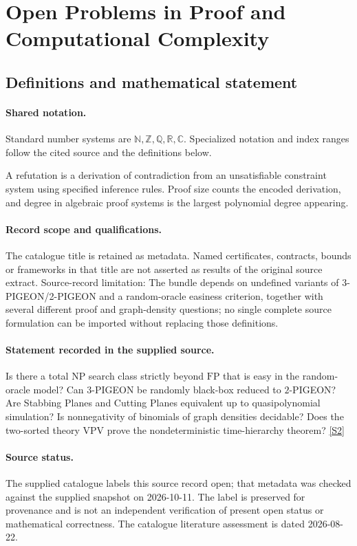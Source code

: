 \documentclass[11pt]{article}
\newcommand{\sref}[2]{\hyperlink{source:#1:#2}{[S#2]}}
\begin{document}
\section{Open Problems in Proof and Computational Complexity}\label{statement}

\subsection{Definitions and mathematical statement}

\paragraph{Shared notation.}Standard number systems are $\mathbb N,\mathbb Z,\mathbb Q,\mathbb R,\mathbb C$. Specialized notation and index ranges follow the cited source and the definitions below.


A refutation is a derivation of contradiction from an unsatisfiable constraint system using specified inference rules. Proof size counts the encoded derivation, and degree in algebraic proof systems is the largest polynomial degree appearing.
\paragraph{Record scope and qualifications.}
The catalogue title is retained as metadata. Named certificates, contracts, bounds or frameworks in that title are not asserted as results of the original source extract.
Source-record limitation: The bundle depends on undefined variants of 3-PIGEON/2-PIGEON and a random-oracle easiness criterion, together with several different proof and graph-density questions; no single complete source formulation can be imported without replacing those definitions.
\paragraph{Statement recorded in the supplied source.}
Is there a total NP search class strictly beyond $\mathrm{FP}$ that is easy in the random-oracle model? Can $3$-PIGEON be randomly black-box reduced to $2$-PIGEON? Are Stabbing Planes and Cutting Planes equivalent up to quasipolynomial simulation? Is nonnegativity of binomials of graph densities decidable? Does the two-sorted theory $\mathrm{VPV}$ prove the nondeterministic time-hierarchy theorem? \sref{statement}{2}
\paragraph{Source status.}
The supplied catalogue labels this source record open; that metadata was checked against the supplied snapshot on 2026-10-11. The label is preserved for provenance and is not an independent verification of present open status or mathematical correctness. The catalogue literature assessment is dated 2026-08-22.
\end{document}
